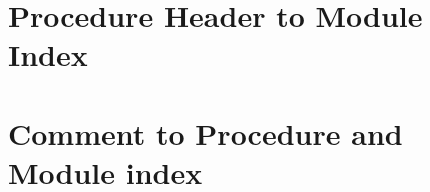 
\sloppy
\newpage 
\setlength{\parskip}{0pt plus 2pt minus 1pt}

\chapter{Procedure Header to Module Index}
{\small

}

\chapter{Comment to Procedure and Module index}
{\small

}

\newpage
\setlength{\parskip}{5pt plus 2pt minus 1pt}
\fussy
